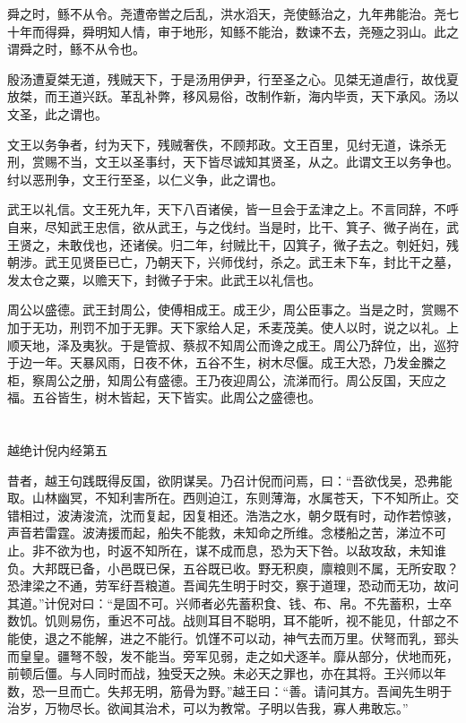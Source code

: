 \documentclass[12pt,UTF8]{ctexbook}
\begin{document}
舜之时，鲧不从令。尧遭帝喾之后乱，洪水滔天，尧使鲧治之，九年弗能治。尧七十年而得舜，舜明知人情，审于地形，知鲧不能治，数谏不去，尧殛之羽山。此之谓舜之时，鲧不从令也。

殷汤遭夏桀无道，残贼天下，于是汤用伊尹，行至圣之心。见桀无道虐行，故伐夏放桀，而王道兴跃。革乱补弊，移风易俗，改制作新，海内毕贡，天下承风。汤以文圣，此之谓也。

文王以务争者，纣为天下，残贼奢佚，不顾邦政。文王百里，见纣无道，诛杀无刑，赏赐不当，文王以圣事纣，天下皆尽诚知其贤圣，从之。此谓文王以务争也。纣以恶刑争，文王行至圣，以仁义争，此之谓也。

武王以礼信。文王死九年，天下八百诸侯，皆一旦会于孟津之上。不言同辞，不呼自来，尽知武王忠信，欲从武王，与之伐纣。当是时，比干、箕子、微子尚在，武王贤之，未敢伐也，还诸侯。归二年，纣贼比干，囚箕子，微子去之。刳妊妇，残朝涉。武王见贤臣已亡，乃朝天下，兴师伐纣，杀之。武王未下车，封比干之墓，发太仓之粟，以赡天下，封微子于宋。此武王以礼信也。

周公以盛德。武王封周公，使傅相成王。成王少，周公臣事之。当是之时，赏赐不加于无功，刑罚不加于无罪。天下家给人足，禾麦茂美。使人以时，说之以礼。上顺天地，泽及夷狄。于是管叔、蔡叔不知周公而谗之成王。周公乃辞位，出，巡狩于边一年。天暴风雨，日夜不休，五谷不生，树木尽偃。成王大恐，乃发金縢之柜，察周公之册，知周公有盛德。王乃夜迎周公，流涕而行。周公反国，天应之福。五谷皆生，树木皆起，天下皆实。此周公之盛德也。


\part{}

越绝计倪内经第五

昔者，越王句践既得反国，欲阴谋吴。乃召计倪而问焉，曰：“吾欲伐吴，恐弗能取。山林幽冥，不知利害所在。西则迫江，东则薄海，水属苍天，下不知所止。交错相过，波涛浚流，沈而复起，因复相还。浩浩之水，朝夕既有时，动作若惊骇，声音若雷霆。波涛援而起，船失不能救，未知命之所维。念楼船之苦，涕泣不可止。非不欲为也，时返不知所在，谋不成而息，恐为天下咎。以敌攻敌，未知谁负。大邦既已备，小邑既已保，五谷既已收。野无积庾，廪粮则不属，无所安取？恐津梁之不通，劳军纡吾粮道。吾闻先生明于时交，察于道理，恐动而无功，故问其道。”计倪对曰：“是固不可。兴师者必先蓄积食、钱、布、帛。不先蓄积，士卒数饥。饥则易伤，重迟不可战。战则耳目不聪明，耳不能听，视不能见，什部之不能使，退之不能解，进之不能行。饥馑不可以动，神气去而万里。伏弩而乳，郅头而皇皇。疆弩不彀，发不能当。旁军见弱，走之如犬逐羊。靡从部分，伏地而死，前顿后僵。与人同时而战，独受天之殃。未必天之罪也，亦在其将。王兴师以年数，恐一旦而亡。失邦无明，筋骨为野。”越王曰：“善。请问其方。吾闻先生明于治岁，万物尽长。欲闻其治术，可以为教常。子明以告我，寡人弗敢忘。”
\end{document}
